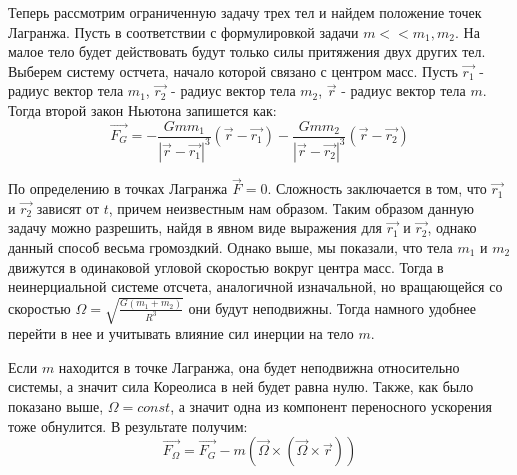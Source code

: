 \documentclass[a4paper]{article} %
\begin{document}
Теперь рассмотрим ограниченную задачу трех тел и найдем положение точек Лагранжа. Пусть в соответствии с формулировкой задачи $m << m_1, m_2$. На малое тело будет действовать будут только силы притяжения двух других тел. Выберем систему остчета, начало которой связано с центром масс. Пусть $\vec{r_1}$ - радиус вектор тела $m_1$, $\vec{r_2}$ - радиус вектор тела $m_2$, $\vec{r}$ - радиус вектор тела $m$. Тогда второй закон Ньютона запишется как:
\begin{equation}
\vec{F_G} = -\frac{Gmm_1}{|\vec{r} - \vec{r_1}|^3}(\vec{r} - \vec{r_1}) - \frac{Gmm_2}{|\vec{r} - \vec{r_2}|^3}(\vec{r} - \vec{r_2})
\end{equation}

По определению в точках Лагранжа $\vec{F} = 0$. Сложность заключается в том, что $\vec{r_1}$ и $\vec{r_2}$ зависят от $t$, причем неизвестным нам образом. Таким образом данную задачу можно разрешить, найдя в явном виде выражения для $\vec{r_1}$ и $\vec{r_2}$, однако данный способ весьма громоздкий. Однако выше, мы показали, что тела $m_1$ и $m_2$ движутся в одинаковой угловой скоростью вокруг центра масс. Тогда в неинерциальной системе отсчета, аналогичной изначальной, но вращающейся со скоростью $\Omega = \sqrt{\frac{G(m_1 + m_2)}{R^3}}$ они будут неподвижны. Тогда намного удобнее перейти в нее и учитывать влияние сил инерции на тело $m$.

Если $m$ находится в точке Лагранжа, она будет неподвижна относительно системы, а значит сила Кореолиса в ней будет равна нулю. Также, как было показано выше, $\Omega = const$, а значит одна из компонент переносного ускорения тоже обнулится. В результате получим:
\begin{equation}
\vec{F_\Omega} = \vec{F_G} - m(\vec{\Omega}\times(\vec{\Omega}\times\vec{r}))
\end{equation}
\end{document}

